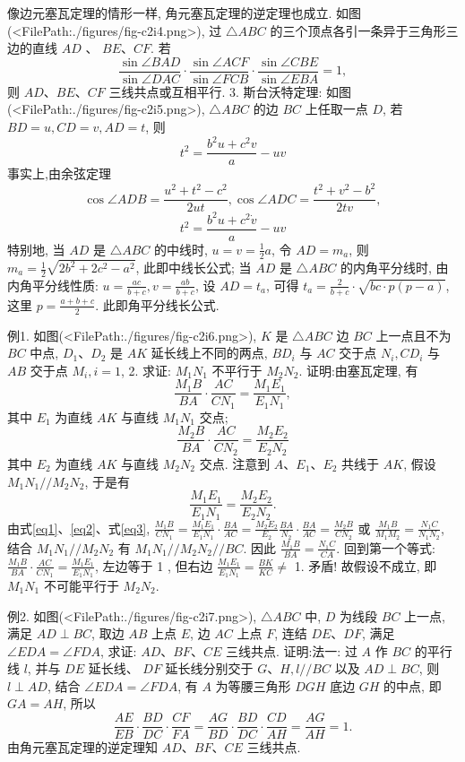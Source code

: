 像边元塞瓦定理的情形一样, 角元塞瓦定理的逆定理也成立.
如图(<FilePath:./figures/fig-c2i4.png>), 过 $\triangle A B C$ 的三个顶点各引一条异于三角形三边的直线 $A D$ 、 $B E 、 C F$. 若
$$
\frac{\sin \angle B A D}{\sin \angle D A C} \cdot \frac{\sin \angle A C F}{\sin \angle F C B} \cdot \frac{\sin \angle C B E}{\sin \angle E B A}=1,
$$
则 $A D 、 B E 、 C F$ 三线共点或互相平行.
3. 斯台沃特定理: 如图(<FilePath:./figures/fig-c2i5.png>), $\triangle A B C$ 的边 $B C$ 上任取一点 $D$, 若 $B D= u, C D=v, A D=t$, 则
$$
t^2=\frac{b^2 u+c^2 v}{a}-u v
$$
事实上,由余弦定理
$$
\cos \angle A D B=\frac{u^2+t^2-c^2}{2 u t}, \cos \angle A D C=\frac{t^2+v^2-b^2}{2 t v},
$$
$$
t^2=\frac{b^2 u+c^2 \dot{v}}{a}-u v
$$
特别地, 当 $A D$ 是 $\triangle A B C$ 的中线时, $u=v=\frac{1}{2} a$, 令 $A D=m_a$, 则 $m_a= \frac{1}{2} \sqrt{2 b^2+2 c^2-a^2}$, 此即中线长公式; 当 $A D$ 是 $\triangle A B C$ 的内角平分线时, 由内角平分线性质: $u=\frac{a c}{b+c}, v=\frac{a b}{b+c}$, 设 $A D=t_a$, 可得 $t_a=\frac{2}{b+c} \cdot \sqrt{b c \cdot p(p-a)}$, 这里 $p=\frac{a+b+c}{2}$. 此即角平分线长公式.



例1. 如图(<FilePath:./figures/fig-c2i6.png>), $K$ 是 $\triangle A B C$ 边 $B C$ 上一点且不为 $B C$ 中点, $D_1 、 D_2$ 是 $A K$ 延长线上不同的两点, $B D_i$ 与 $A C$ 交于点 $N_i, C D_i$ 与 $A B$ 交于点 $M_i, i=1$, 2. 求证: $M_1 N_1$ 不平行于 $M_2 N_2$.
证明:由塞瓦定理, 有
$$
\frac{M_1 B}{B A} \cdot \frac{A C}{C N_1}=\frac{M_1 E_1}{E_1 N_1}, \label{eq1}
$$
其中 $E_1$ 为直线 $A K$ 与直线 $M_1 N_1$ 交点;
$$
\frac{M_2 B}{B A} \cdot \frac{A C}{C N_2}=\frac{M_2 E_2}{E_2 N_2} \label{eq2}
$$
其中 $E_2$ 为直线 $A K$ 与直线 $M_2 N_2$ 交点.
注意到 $A 、 E_1 、 E_2$ 共线于 $A K$, 假设 $M_1 N_1 / / M_2 N_2$, 于是有
$$
\frac{M_1 E_1}{E_1 N_1}=\frac{M_2 E_2}{E_2 N_2} . \label{eq3}
$$
由式\ref{eq1}、\ref{eq2}、式\ref{eq3}, $\frac{M_1 B}{C N_1}=\frac{M_1 E_1}{E_1 N_1} \cdot \frac{B A}{A C}=\frac{M_2 E_2}{E_2} \frac{B A}{N_2} \cdot \frac{B A}{A C}=\frac{M_2 B}{C N_2}$ 或 $\frac{M_1 B}{M_1 M_2}=\frac{N_1 C}{N_1 N_2}$,
结合 $M_1 N_1 / / M_2 N_2$ 有 $M_1 N_1 / / M_2 N_2 / / B C$. 因此 $\frac{M_1 B}{B A}=\frac{N_1 C}{C A}$.
回到第一个等式: $\frac{M_1 B}{B A} \cdot \frac{A C}{C N_1}=\frac{M_1 E_1}{E_1 N_1}$, 左边等于 1 , 但右边 $\frac{M_1 E_1}{E_1 N_1}=\frac{B K}{K C} \neq$ 1. 矛盾! 故假设不成立, 即 $M_1 N_1$ 不可能平行于 $M_2 N_2$.



例2. 如图(<FilePath:./figures/fig-c2i7.png>), $\triangle A B C$ 中, $D$ 为线段 $B C$ 上一点, 满足 $A D \perp B C$, 取边 $A B$ 上点 $E$, 边 $A C$ 上点 $F$, 连结 $D E 、 D F$, 满足 $\angle E D A=\angle F D A$, 求证: $A D 、 B F 、 C E$ 三线共点.
证明:法一: 过 $A$ 作 $B C$ 的平行线 $l$, 并与 $D E$ 延长线、 $D F$ 延长线分别交于 $G 、 H, l / / B C$ 以及 $A D \perp B C$, 则 $l \perp A D$, 结合 $\angle E D A=\angle F D A$, 有 $A$ 为等腰三角形 $D G H$ 底边 $G H$ 的中点, 即 $G A=A H$, 所以
$$
\frac{A E}{E B} \cdot \frac{B D}{D C} \cdot \frac{C F}{F A}=\frac{A G}{B D} \cdot \frac{B D}{D C} \cdot \frac{C D}{A H}=\frac{A G}{A H}=1 .
$$
由角元塞瓦定理的逆定理知 $A D 、 B F 、 C E$ 三线共点.



